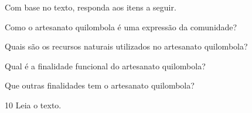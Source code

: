 Com base no texto, responda aos itens a seguir.

\begin{escolha}
\item Como o artesanato quilombola é uma expressão da comunidade?

\item Quais são os recursos naturais utilizados no artesanato quilombola?

\item Qual é a finalidade funcional do artesanato quilombola?

\item Que outras finalidades tem o artesanato quilombola?
\end{escolha}

\num{10} Leia o texto.\bigskip

